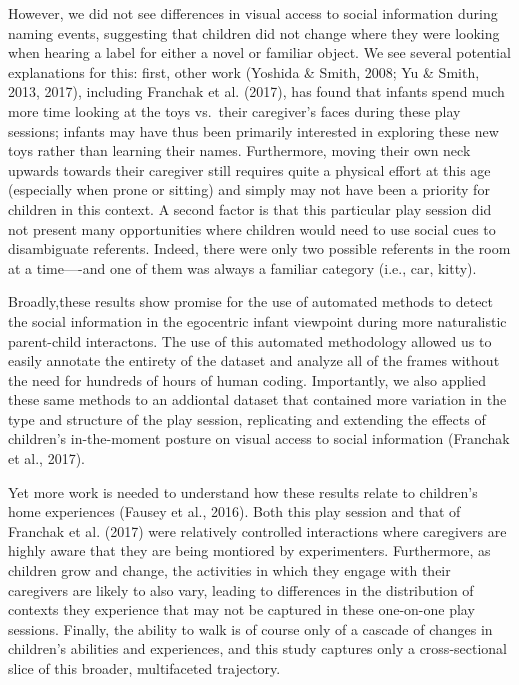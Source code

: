 \documentclass[english,man]{apa6}
\begin{document}
However, we did not see differences in visual access to social
information during naming events, suggesting that children did not
change where they were looking when hearing a label for either a novel
or familiar object. We see several potential explanations for this:
first, other work (Yoshida \& Smith, 2008; Yu \& Smith, 2013, 2017),
including Franchak et al. (2017), has found that infants spend much more
time looking at the toys vs.~their caregiver's faces during these play
sessions; infants may have thus been primarily interested in exploring
these new toys rather than learning their names. Furthermore, moving
their own neck upwards towards their caregiver still requires quite a
physical effort at this age (especially when prone or sitting) and
simply may not have been a priority for children in this context. A
second factor is that this particular play session did not present many
opportunities where children would need to use social cues to
disambiguate referents. Indeed, there were only two possible referents
in the room at a time----and one of them was always a familiar category
(i.e., car, kitty).

Broadly,these results show promise for the use of automated methods to
detect the social information in the egocentric infant viewpoint during
more naturalistic parent-child interactons. The use of this automated
methodology allowed us to easily annotate the entirety of the dataset
and analyze all of the frames without the need for hundreds of hours of
human coding. Importantly, we also applied these same methods to an
addiontal dataset that contained more variation in the type and
structure of the play session, replicating and extending the effects of
children's in-the-moment posture on visual access to social information
(Franchak et al., 2017).

Yet more work is needed to understand how these results relate to
children's home experiences (Fausey et al., 2016). Both this play
session and that of Franchak et al. (2017) were relatively controlled
interactions where caregivers are highly aware that they are being
montiored by experimenters. Furthermore, as children grow and change,
the activities in which they engage with their caregivers are likely to
also vary, leading to differences in the distribution of contexts they
experience that may not be captured in these one-on-one play sessions.
Finally, the ability to walk is of course only of a cascade of changes
in children's abilities and experiences, and this study captures only a
cross-sectional slice of this broader, multifaceted trajectory.
\end{document}
